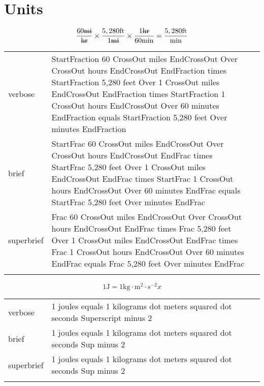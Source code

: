 
\section{Units}
\label{sec:units}

\R
\E \[\frac{60\sout{mi}}{\sout{hr}}\times\frac{5,280 \text{ft}}{1\sout{mi}}\times\frac{1\sout{hr}}{60\text{min}}=\frac{5,280\text{ft}}{\text{min}}\]

\begin{longtable}[c]{@{}lll@{}}
\toprule\addlinespace
verbose & StartFraction 60 CrossOut miles EndCrossOut Over CrossOut
hours EndCrossOut EndFraction times StartFraction 5,280 feet Over 1
CrossOut miles EndCrossOut EndFraction times StartFraction 1 CrossOut
hours EndCrossOut Over 60 minutes EndFraction equals StartFraction 5,280
feet Over minutes EndFraction &

\\\addlinespace
brief & StartFrac 60 CrossOut miles EndCrossOut Over CrossOut hours
EndCrossOut EndFrac times StartFrac 5,280 feet Over 1 CrossOut miles
EndCrossOut EndFrac times StartFrac 1 CrossOut hours EndCrossOut Over 60
minutes EndFrac equals StartFrac 5,280 feet Over minutes EndFrac &

\\\addlinespace
superbrief & Frac 60 CrossOut miles EndCrossOut Over CrossOut hours
EndCrossOut EndFrac times Frac 5,280 feet Over 1 CrossOut miles
EndCrossOut EndFrac times Frac 1 CrossOut hours EndCrossOut Over 60
minutes EndFrac equals Frac 5,280 feet Over minutes EndFrac &

\\\addlinespace
\bottomrule
\end{longtable}



\E \[1\text{J}=1\text{kg}\cdot\text{m}^2\cdot\text{s}^{-2}x\]
\begin{longtable}[c]{@{}lll@{}}
\toprule\addlinespace
verbose & 1 joules equals 1 kilograms dot meters squared dot seconds
Superscript minus 2 &

\\\addlinespace
brief & 1 joules equals 1 kilograms dot meters squared dot seconds Sup
minus 2 &

\\\addlinespace
superbrief & 1 joules equals 1 kilograms dot meters squared dot seconds
Sup minus 2 &

\\\addlinespace
\bottomrule
\end{longtable}


